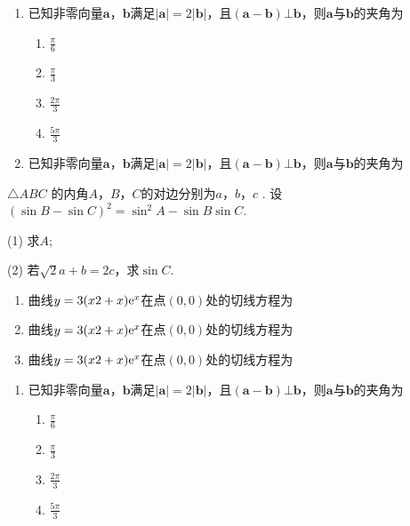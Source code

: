 \documentclass[12pt,a4paper]{exam}
\begin{document}
\begin{questions}
\begin{enumerate}
\item 已知非零向量$\mathbf{a}$，$\mathbf{b}$满足$|\mathbf{a}| = 2|\mathbf{b} |$，且$(\mathbf{a}-\mathbf{b}) \bot \mathbf{b}$，则$\mathbf{a}$与$\mathbf{b}$的夹角为
\begin{enumerate}
\item $\frac{\pi}{6} $
\item $\frac{\pi}{3} $
\item $\frac{2\pi}{3} $
\item $\frac{5\pi}{3} $
\end{enumerate}

\item 已知非零向量$\mathbf{a}$，$\mathbf{b}$满足$|\mathbf{a}| = 2|\mathbf{b} |$，且$(\mathbf{a}-\mathbf{b}) \bot \mathbf{b}$，则$\mathbf{a}$与$\mathbf{b}$的夹角为


\end{enumerate}



\question

$\triangle ABC$ 的内角$A$，$B$，$C$的对边分别为$a$，$b$，$c$ . 设$(\sin B- \sin C)^2 = \sin^2 A-\sin B \sin C$.

(1) 求$A$;

(2) 若$\sqrt{2} a+b=2c$，求$\sin C$.




\begin{enumerate}
\item 曲线$y = 3(x2 +x){\rm e}^x$在点$(0,0)$处的切线方程为\blankline
\item 曲线$y = 3(x2 +x){\rm e}^x$在点$(0,0)$处的切线方程为\blankline
\item 曲线$y = 3(x2 +x){\rm e}^x$在点$(0,0)$处的切线方程为\blankline
\end{enumerate}




\begin{enumerate}
\item 已知非零向量$\mathbf{a}$，$\mathbf{b}$满足$|\mathbf{a}| = 2|\mathbf{b} |$，且$(\mathbf{a}-\mathbf{b}) \bot \mathbf{b}$，则$\mathbf{a}$与$\mathbf{b}$的夹角为
\begin{enumerate}
\item $\frac{\pi}{6} $
\item $\frac{\pi}{3} $
\item $\frac{2\pi}{3} $
\item $\frac{5\pi}{3} $
\end{enumerate}


\end{enumerate}
\end{questions}
\end{document}
